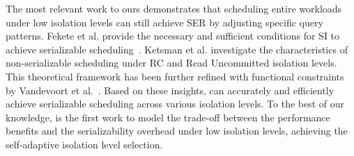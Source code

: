 The most relevant work to ours demonstrates that scheduling entire workloads under low isolation levels can still achieve SER by adjusting specific query patterns. Fekete et al. provide the necessary and sufficient conditions for SI to achieve serializable scheduling~\cite{DBLP:conf/pods/Fekete05, alomari2008serializable}. 
Ketsman et al. \cite{DBLP:journals/tods/KetsmanKNV22, DBLP:journals/pvldb/VandevoortK0N21} investigate the characteristics of non-serializable scheduling under RC and Read Uncommitted isolation levels. This theoretical framework has been further refined with functional constraints by Vandevoort et al.~\cite{DBLP:conf/icdt/VandevoortK0N22}. 
Based on these insights, \sysname can accurately and efficiently achieve serializable scheduling across various isolation levels. To the best of our knowledge, \sysname is the first work to model the trade-off between the performance benefits and the serializability overhead under low isolation levels, achieving the self-adaptive isolation level selection. 